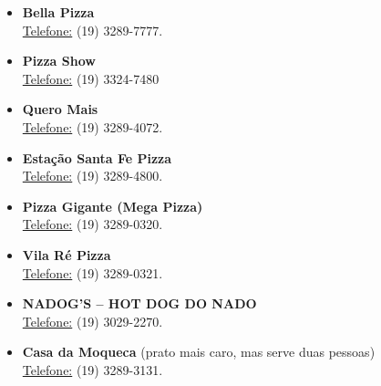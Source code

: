 \begin{itemize}
\item  \textbf{Bella Pizza}
\\\underline{Telefone:} (19) 3289-7777.
\end{itemize}

\begin{itemize}
\item  \textbf{Pizza Show}
\\\underline{Telefone:} (19) 3324-7480
\end{itemize}

\begin{itemize}
\item  \textbf{Quero Mais}
\\\underline{Telefone:} (19) 3289-4072.
\end{itemize}

\begin{itemize}
\item  \textbf{Estação Santa Fe Pizza}
\\\underline{Telefone:} (19) 3289-4800.
\end{itemize}

\begin{itemize}
\item  \textbf{Pizza Gigante (Mega Pizza)}
\\\underline{Telefone:} (19) 3289-0320.
\end{itemize}

\begin{itemize}
\item  \textbf{Vila Ré Pizza}
\\\underline{Telefone:} (19) 3289-0321.
\end{itemize}

\begin{itemize}
\item  \textbf{NADOG'S -- HOT DOG DO NADO}
\\\underline{Telefone:} (19) 3029-2270.
\end{itemize}

\begin{itemize}
\item  \textbf{Casa da Moqueca} (prato mais caro, mas serve duas pessoas)
\\\underline{Telefone:} (19) 3289-3131.
\end{itemize}

